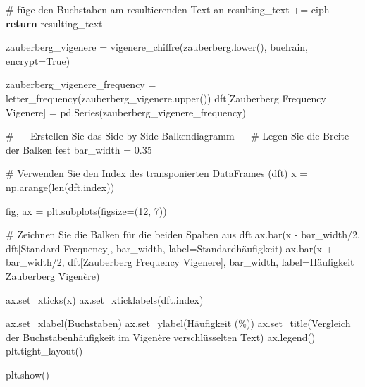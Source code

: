 \documentclass[
  nswissgerman,
  a4paper,
  DIV=11,
  numbers=noendperiod,
  ngerman]{scrreprt}
\newenvironment{Shaded}{\begin{snugshade}}{\end{snugshade}}
\newcommand{\BuiltInTok}[1]{\textcolor[rgb]{0.00,0.23,0.31}{#1}}
\newcommand{\CommentTok}[1]{\textcolor[rgb]{0.37,0.37,0.37}{#1}}
\newcommand{\ControlFlowTok}[1]{\textcolor[rgb]{0.00,0.23,0.31}{\textbf{#1}}}
\newcommand{\DecValTok}[1]{\textcolor[rgb]{0.68,0.00,0.00}{#1}}
\newcommand{\FloatTok}[1]{\textcolor[rgb]{0.68,0.00,0.00}{#1}}
\newcommand{\NormalTok}[1]{\textcolor[rgb]{0.00,0.23,0.31}{#1}}
\newcommand{\OperatorTok}[1]{\textcolor[rgb]{0.37,0.37,0.37}{#1}}
\newcommand{\StringTok}[1]{\textcolor[rgb]{0.13,0.47,0.30}{#1}}
\newcommand{\VariableTok}[1]{\textcolor[rgb]{0.07,0.07,0.07}{#1}}
\begin{document}
\begin{Shaded}
\begin{Highlighting}[numbers=left,,]
        \CommentTok{\# füge den Buchstaben am resultierenden Text an}
\NormalTok{        resulting\_text }\OperatorTok{+=}\NormalTok{ ciph}
    \ControlFlowTok{return}\NormalTok{ resulting\_text}

\NormalTok{zauberberg\_vigenere }\OperatorTok{=}\NormalTok{ vigenere\_chiffre(zauberberg.lower(), }\StringTok{\textquotesingle{}buelrain\textquotesingle{}}\NormalTok{, encrypt}\OperatorTok{=}\VariableTok{True}\NormalTok{)}

\NormalTok{zauberberg\_vigenere\_frequency }\OperatorTok{=}\NormalTok{ letter\_frequency(zauberberg\_vigenere.upper())}
\NormalTok{dft[}\StringTok{\textquotesingle{}Zauberberg Frequency Vigenere\textquotesingle{}}\NormalTok{] }\OperatorTok{=}\NormalTok{ pd.Series(zauberberg\_vigenere\_frequency)}

\CommentTok{\# {-}{-}{-} Erstellen Sie das Side{-}by{-}Side{-}Balkendiagramm {-}{-}{-}}
\CommentTok{\# Legen Sie die Breite der Balken fest}
\NormalTok{bar\_width }\OperatorTok{=} \FloatTok{0.35}

\CommentTok{\# Verwenden Sie den Index des transponierten DataFrames (dft)}
\NormalTok{x }\OperatorTok{=}\NormalTok{ np.arange(}\BuiltInTok{len}\NormalTok{(dft.index))}

\NormalTok{fig, ax }\OperatorTok{=}\NormalTok{ plt.subplots(figsize}\OperatorTok{=}\NormalTok{(}\DecValTok{12}\NormalTok{, }\DecValTok{7}\NormalTok{))}

\CommentTok{\# Zeichnen Sie die Balken für die beiden Spalten aus dft}
\NormalTok{ax.bar(x }\OperatorTok{{-}}\NormalTok{ bar\_width}\OperatorTok{/}\DecValTok{2}\NormalTok{, dft[}\StringTok{\textquotesingle{}Standard Frequency\textquotesingle{}}\NormalTok{], bar\_width, label}\OperatorTok{=}\StringTok{\textquotesingle{}Standardhäufigkeit\textquotesingle{}}\NormalTok{)}
\NormalTok{ax.bar(x }\OperatorTok{+}\NormalTok{ bar\_width}\OperatorTok{/}\DecValTok{2}\NormalTok{, dft[}\StringTok{\textquotesingle{}Zauberberg Frequency Vigenere\textquotesingle{}}\NormalTok{], bar\_width, label}\OperatorTok{=}\StringTok{\textquotesingle{}Häufigkeit Zauberberg Vigenère\textquotesingle{}}\NormalTok{)}

\NormalTok{ax.set\_xticks(x)}
\NormalTok{ax.set\_xticklabels(dft.index)}

\NormalTok{ax.set\_xlabel(}\StringTok{\textquotesingle{}Buchstaben\textquotesingle{}}\NormalTok{)}
\NormalTok{ax.set\_ylabel(}\StringTok{\textquotesingle{}Häufigkeit (\%)\textquotesingle{}}\NormalTok{)}
\NormalTok{ax.set\_title(}\StringTok{\textquotesingle{}Vergleich der Buchstabenhäufigkeit im Vigenère verschlüsselten Text\textquotesingle{}}\NormalTok{)}
\NormalTok{ax.legend()}
\NormalTok{plt.tight\_layout()}

\NormalTok{plt.show()}
\end{Highlighting}
\end{Shaded}
\end{document}
